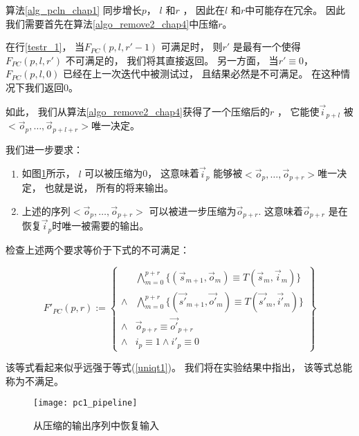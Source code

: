 算法\ref{alg_pcln_chap1} 同步增长$p$， $l$ 和$r$ ，
因此在$l$ 和$r$中可能存在冗余。
因此我们需要首先在算法\ref{algo_remove2_chap4}中压缩$r$。


在行\ref{testr_1}，
当$F_{PC}(p,l,r'-1)$ 可满足时，
则$r'$ 是最有一个使得$F_{PC}(p,l,r')$ 不可满足的，
我们将其直接返回。
另一方面，
当$r'\equiv 0$，
$F_{PC}(p,l,0)$ 已经在上一次迭代中被测试过，
且结果必然是不可满足。
在这种情况下我们返回$0$。


如此，
我们从算法\ref{algo_remove2_chap4}获得了一个压缩后的$r$ ，
它能使$\vec{i}_{p+l}$ 被$<\vec{o}_{p},\dots,\vec{o}_{p+l+r}>$唯一决定。

我们进一步要求：
\begin{enumerate}
 \item 如图\ref{fig_pc1_chap4}所示，
 $l$ 可以被压缩为0，
 这意味着$\vec{i}_{p}$ 能够被$<\vec{o}_{p},\dots,\vec{o}_{p+r}>$唯一决定，
 也就是说，
 所有的将来输出。
 \item 上述的序列$<\vec{o}_{p},\dots,\vec{o}_{p+r}>$
 可以被进一步压缩为$\vec{o}_{p+r}$.
 这意味着$\vec{o}_{p+r}$ 是在恢复$\vec{i}_p$时唯一被需要的输出。
\end{enumerate}

检查上述两个要求等价于下式的不可满足：

\begin{equation}\label{uniqt11_chap4}
F'_{PC}(p,r):=
\left\{
\begin{array}{cc}
&\bigwedge_{m=0}^{p+r}
\{
(\vec{s}_{m+1},\vec{o}_m)\equiv T(\vec{s}_m,\vec{i}_m)
\}
\\
\wedge&\bigwedge_{m=0}^{p+r}
\{
(\vec{s'}_{m+1},\vec{o'}_m)\equiv T(\vec{s'}_m,\vec{i'}_m)
\}
\\
\wedge&\vec{o}_{p+r}\equiv \vec{o'}_{p+r} \\
\wedge& i_{p}\equiv 1 \wedge  i'_{p}\equiv 0
\end{array}
\right\}
\end{equation}


该等式看起来似乎远强于等式(\ref{uniqt1})。
我们将在实验结果中指出，
该等式总能称为不满足。

\begin{figure}[b]
\begin{center}
\texttt{[image: pc1\_pipeline]}
\end{center}
\caption{从压缩的输出序列中恢复输入}
  \label{fig_pc1_chap4}
\end{figure}

